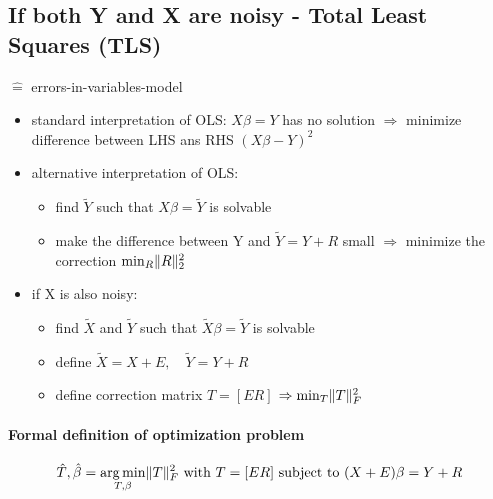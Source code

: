 \documentclass[11pt]{article}
\DeclareMathOperator*{\argmin}{arg\,min}
\DeclarePairedDelimiter\norm{\lVert}{\rVert}
\begin{document}
\begin{itemize}
    \subsection{If both Y and X are noisy - Total Least Squares (TLS)} $\hat{=}$
      errors-in-variables-model
      \begin{itemize}
        \item standard interpretation of OLS: $X\beta=Y$ has no solution
          $\Rightarrow$ minimize difference between LHS ans RHS $(X\beta-Y)^2$
        \item alternative interpretation of OLS:
        \begin{itemize}
          \item find $\tilde{Y}$ such that $X\beta=\tilde{Y}$ is solvable
          \item make the difference between Y and $\tilde{Y}=Y+R$ small
          $\Rightarrow$ minimize the correction $\min_R \norm{R}_2^2$
        \end{itemize}
        \item if X is also noisy:
        \begin{itemize}
          \item find $\tilde{X}$ and $\tilde{Y}$ such that $\tilde{X}\beta=\tilde{Y}$
          is solvable
          \item define $\tilde{X}=X+E, \quad \tilde{Y}=Y+R$
          \item define correction matrix $T=[E R]$ $\Rightarrow \min_T \norm{T}_F^2$
        \end{itemize}
      \end{itemize}
      \paragraph{Formal definition of optimization problem}
      \begin{equation*}
        \hat{T}, \hat{\beta} = \argmin_{T, \beta} \norm{T}_F^2 \text{ with } T=[E R]
        \text{ subject to } (X+E)\beta=Y+R
      \end{equation*}

\end{itemize}
\end{document}
